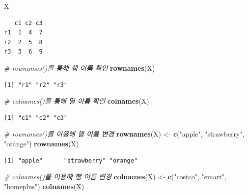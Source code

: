 \documentclass[
  11pt,
]{krantz}
\newenvironment{Shaded}{\begin{snugshade}}{\end{snugshade}}
\newcommand{\CommentTok}[1]{\textcolor[rgb]{0.37,0.37,0.37}{\textit{#1}}}
\newcommand{\KeywordTok}[1]{\textcolor[rgb]{0.27,0.27,0.27}{\textbf{#1}}}
\newcommand{\NormalTok}[1]{#1}
\newcommand{\StringTok}[1]{\textcolor[rgb]{0.5,0.5,0.5}{#1}}
\begin{document}
\begin{Shaded}
\begin{Highlighting}[]
\NormalTok{X}
\end{Highlighting}
\end{Shaded}

\begin{verbatim}
   c1 c2 c3
r1  1  4  7
r2  2  5  8
r3  3  6  9
\end{verbatim}

\begin{Shaded}
\begin{Highlighting}[]
\CommentTok{# rownames()를 통해 행 이름 확인}
\KeywordTok{rownames}\NormalTok{(X)}
\end{Highlighting}
\end{Shaded}

\begin{verbatim}
[1] "r1" "r2" "r3"
\end{verbatim}

\begin{Shaded}
\begin{Highlighting}[]
\CommentTok{# colnames()를 통해 열 이름 확인}
\KeywordTok{colnames}\NormalTok{(X)}
\end{Highlighting}
\end{Shaded}

\begin{verbatim}
[1] "c1" "c2" "c3"
\end{verbatim}

\begin{Shaded}
\begin{Highlighting}[]
\CommentTok{# rownames()를 이용해 행 이름 변경}
\KeywordTok{rownames}\NormalTok{(X) <-}\StringTok{ }\KeywordTok{c}\NormalTok{(}\StringTok{"apple"}\NormalTok{, }\StringTok{"strawberry"}\NormalTok{, }\StringTok{"orange"}\NormalTok{)}
\KeywordTok{rownames}\NormalTok{(X)}
\end{Highlighting}
\end{Shaded}

\begin{verbatim}
[1] "apple"      "strawberry" "orange"    
\end{verbatim}

\begin{Shaded}
\begin{Highlighting}[]
\CommentTok{# colnames()를 이용해 행 이름 변경}
\KeywordTok{colnames}\NormalTok{(X) <-}\StringTok{ }\KeywordTok{c}\NormalTok{(}\StringTok{"costco"}\NormalTok{, }\StringTok{"emart"}\NormalTok{, }\StringTok{"homeplus"}\NormalTok{)}
\KeywordTok{colnames}\NormalTok{(X)}
\end{Highlighting}
\end{Shaded}
\end{document}

